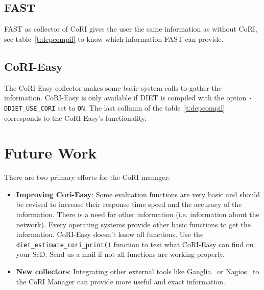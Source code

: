 \subsection{FAST}
FAST as collector of CoRI gives the user the same information as
without CoRI, see table~\ref{t:depcompil} to know which information FAST can
provide.

\subsection{CoRI-Easy}
The CoRI-Easy collector makes some basic system calls to gather the
information. CoRI-Easy is only available if DIET is compiled with the option
\texttt{-DDIET\_USE\_CORI} set to \texttt{ON}. The last collumn of the table~\ref{t:depcompil}
corresponds to the CoRI-Easy's functionality.

\section{Future Work}

There are two primary efforts for the CoRI manager:
\begin{itemize}
\item \textbf{Improving Cori-Easy}: Some evaluation functions are very basic and
  should be revised to increase their response time speed and the
  accuracy of the information.
  There is a need for other information (i.e. information about the network).
  Every operating systems provide other basic functions to get the information.
  CoRI-Easy doesn't know all functions. Use the \texttt{diet\_estimate\_cori\_print()}
function to test what CoRI-Easy can find on your SeD. Send us a mail if not 
all functions are working properly.

\item \textbf{New collectors}:
  Integrating other external tools like Ganglia~\cite{Ganglia} or Nagios~\cite{Nagios} to the
  CoRI Manager can provide more useful and exact information.
\end{itemize}

